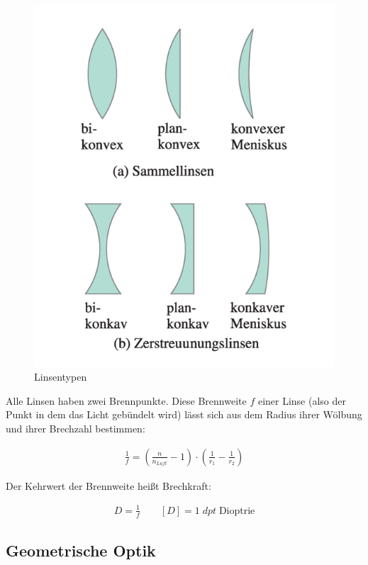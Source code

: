 \documentclass[a4paper]{scrartcl}
\numberwithin{equation}{subsection}
\begin{document}
\begin{figure}[H]
\includegraphics[width=12cm]{Abbildungen/linsentypen}
\centering
\caption{Linsentypen \cite{anl}}
\centering
\label{fig:linsentypen}
\end{figure}

Alle Linsen haben zwei Brennpunkte. Diese Brennweite $f$ einer Linse (also der Punkt in dem das Licht gebündelt wird) lässt sich aus dem Radius ihrer Wölbung und ihrer Brechzahl bestimmen: \cite{anl}

\begin{align}
\frac{1}{f} =  \left( \frac{n}{n_{\textit{Luft}}} - 1 \right) \cdot \left( \frac{1}{r_1} - \frac{1}{r_2} \right)
\end{align}

Der Kehrwert der Brennweite heißt Brechkraft:

\begin{align}
D = \frac{1}{f} \qquad [D] = 1 \;dpt \; \text{Dioptrie}
\end{align}

\subsection{Geometrische Optik}
\end{document}
